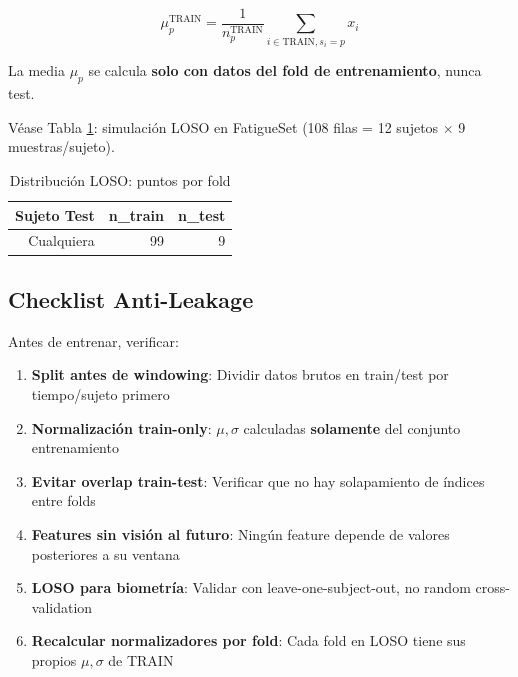 \documentclass[11pt,twoside,a4paper]{article}
\begin{document}
\begin{equation}
\mu_p^{\text{TRAIN}} = \frac{1}{n_p^{\text{TRAIN}}} \sum_{i \in \text{TRAIN}, s_i=p} x_i
\end{equation}

La media $\mu_p$ se calcula \textbf{solo con datos del fold de entrenamiento}, nunca test.

Véase Tabla \ref{tab:loso_sim}: simulación LOSO en FatigueSet (108 filas = 12 sujetos $\times$ 9 muestras/sujeto).

\begin{table}[H]
\centering
\caption{Distribución LOSO: puntos por fold}
\label{tab:loso_sim}
\begin{tabular}{|r|r|r|}
\hline
Sujeto Test & n\_train & n\_test \\
\hline
Cualquiera & 99 & 9 \\
\hline
\end{tabular}
\end{table}

\subsection{Checklist Anti-Leakage}

Antes de entrenar, verificar:

\begin{enumerate}
    \item[$\checkmark$] \textbf{Split antes de windowing}: Dividir datos brutos en train/test por tiempo/sujeto primero

    \item[$\checkmark$] \textbf{Normalización train-only}: $\mu, \sigma$ calculadas \textbf{solamente} del conjunto entrenamiento

    \item[$\checkmark$] \textbf{Evitar overlap train-test}: Verificar que no hay solapamiento de índices entre folds

    \item[$\checkmark$] \textbf{Features sin visión al futuro}: Ningún feature depende de valores posteriores a su ventana

    \item[$\checkmark$] \textbf{LOSO para biometría}: Validar con leave-one-subject-out, no random cross-validation

    \item[$\checkmark$] \textbf{Recalcular normalizadores por fold}: Cada fold en LOSO tiene sus propios $\mu, \sigma$ de TRAIN
\end{enumerate}
\end{document}
